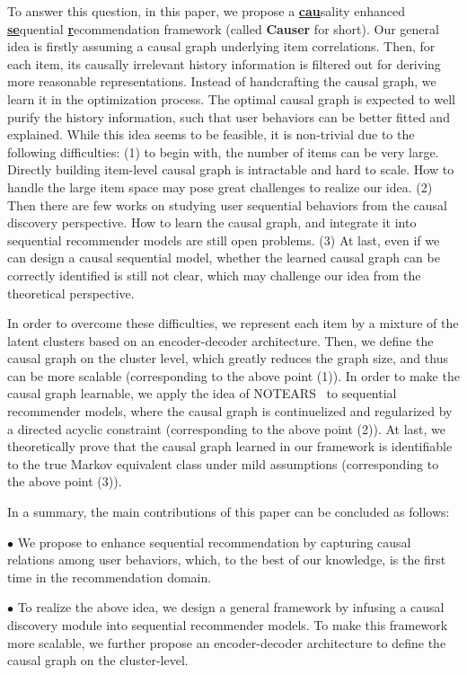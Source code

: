 \documentclass[conference]{IEEEtran}
\theoremstyle{definition}
\theoremstyle{theorem}
\theoremstyle{proof}
\theoremstyle{remark}
\begin{document}
To answer this question, in this paper, we propose a \underline{\textbf{cau}}sality enhanced \underline{\textbf{se}}quential \underline{\textbf{r}}ecommendation framework (called \textbf{Causer} for short).
Our general idea is firstly assuming a causal graph underlying item correlations.
Then, for each item, its causally irrelevant history information is filtered out for deriving more reasonable representations.
Instead of handcrafting the causal graph, we learn it in the optimization process.
The optimal causal graph is expected to well purify the history information, such that user behaviors can be better fitted and explained.
While this idea seems to be feasible, it is non-trivial due to the following difficulties:
(1) to begin with, the number of items can be very large.
Directly building item-level causal graph is intractable and hard to scale.
How to handle the large item space may pose great challenges to realize our idea.
(2) Then there are {few works} on studying user sequential behaviors from the causal discovery perspective.
How to learn the causal graph, and integrate it into sequential recommender models are still open problems.
(3) At last, {even if we can design a causal sequential model}, whether the learned causal graph can be correctly identified is still not clear, which may challenge our idea from the theoretical perspective.

In order to overcome these difficulties, we represent each item by a mixture of the latent clusters based on an encoder-decoder architecture.
Then, we define the causal graph on the cluster level, which greatly reduces the graph size, and thus can be more scalable (corresponding to the above point (1)).
In order to make the causal graph learnable, we apply the idea of NOTEARS~\cite{zheng2018dags} to sequential recommender models, where the causal graph is continuelized and regularized by a directed acyclic constraint (corresponding to the above point (2)).
At last, we theoretically {prove} that the causal graph learned in our framework is identifiable to the true Markov equivalent class under mild assumptions (corresponding to the above point (3)).

In a summary, the main contributions of this paper can be concluded as follows:

$\bullet$ We propose to enhance sequential recommendation by capturing causal relations among user behaviors, which, to the best of our knowledge, is the first time in the recommendation domain.

$\bullet$ To realize the above idea, we design a general framework by infusing a causal discovery module into sequential recommender models.
To make this framework more scalable, we further propose an encoder-decoder architecture to define the causal graph on the cluster-level.
\end{document}
